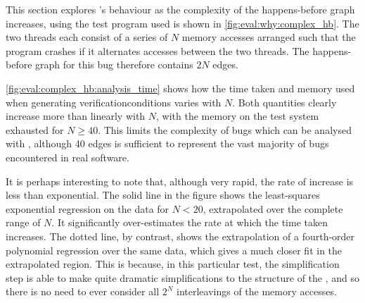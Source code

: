 \noindent
This section explores {\technique}'s behaviour as the complexity of
the happens-before graph increases, using the test program used is
shown in \autoref{fig:eval:why:complex_hb}.  The two threads each
consist of a series of $N$ memory accesses arranged such that the
program crashes if it alternates accesses between the two threads.
The happens-before graph for this bug therefore contains $2N$ edges.


\autoref{fig:eval:complex_hb:analysis_time} shows how the time taken
and memory used when generating \glspl{verificationcondition} varies
with $N$.  Both quantities clearly increase more than linearly with
$N$, with the memory on the test system exhausted for $N \geq 40$.
This limits the complexity of bugs which can be analysed with
{\technique}, although 40 edges is sufficient to represent the vast
majority of bugs encountered in real software\needCite{}.

 It is perhaps interesting to
note that, although very rapid, the rate of increase is less than
exponential.  The solid line in the figure shows the least-squares
exponential regression on the data for $N<20$, extrapolated over the
complete range of $N$.  It significantly over-estimates the rate at
which the time taken increases.  The dotted line, by contrast, shows
the extrapolation of a fourth-order polynomial regression over the
same data, which gives a much closer fit in the extrapolated region.
This is because, in this particular test, the {\StateMachine}
simplification step is able to make quite dramatic simplifications to
the structure of the {\StateMachines}, and so there is no need to ever
consider all $2^N$ interleavings of the memory accesses.

